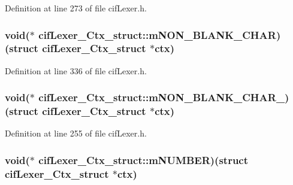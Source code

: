 Definition at line 273 of file cif\-Lexer.\-h.

\hypertarget{structcif_lexer___ctx__struct_ac7a4e9746159f72a6a550ac5cef3c65a}{
\subsubsection[{m\-N\-O\-N\-\_\-\-B\-L\-A\-N\-K\-\_\-\-C\-H\-A\-R}]{\setlength{\rightskip}{0pt plus 5cm}void($\ast$ cif\-Lexer\-\_\-\-Ctx\-\_\-struct\-::m\-N\-O\-N\-\_\-\-B\-L\-A\-N\-K\-\_\-\-C\-H\-A\-R)(struct {\bf cif\-Lexer\-\_\-\-Ctx\-\_\-struct} $\ast$ctx)}}\label{structcif_lexer___ctx__struct_ac7a4e9746159f72a6a550ac5cef3c65a}


Definition at line 336 of file cif\-Lexer.\-h.

\hypertarget{structcif_lexer___ctx__struct_a2a64edf9de25e7b6bee8feb757f6f330}{
\subsubsection[{m\-N\-O\-N\-\_\-\-B\-L\-A\-N\-K\-\_\-\-C\-H\-A\-R\-\_\-}]{\setlength{\rightskip}{0pt plus 5cm}void($\ast$ cif\-Lexer\-\_\-\-Ctx\-\_\-struct\-::m\-N\-O\-N\-\_\-\-B\-L\-A\-N\-K\-\_\-\-C\-H\-A\-R\-\_\-)(struct {\bf cif\-Lexer\-\_\-\-Ctx\-\_\-struct} $\ast$ctx)}}\label{structcif_lexer___ctx__struct_a2a64edf9de25e7b6bee8feb757f6f330}


Definition at line 255 of file cif\-Lexer.\-h.

\hypertarget{structcif_lexer___ctx__struct_a247812c74670d68786941d3c0d96d0e2}{
\subsubsection[{m\-N\-U\-M\-B\-E\-R}]{\setlength{\rightskip}{0pt plus 5cm}void($\ast$ cif\-Lexer\-\_\-\-Ctx\-\_\-struct\-::m\-N\-U\-M\-B\-E\-R)(struct {\bf cif\-Lexer\-\_\-\-Ctx\-\_\-struct} $\ast$ctx)}}\label{structcif_lexer___ctx__struct_a247812c74670d68786941d3c0d96d0e2}


